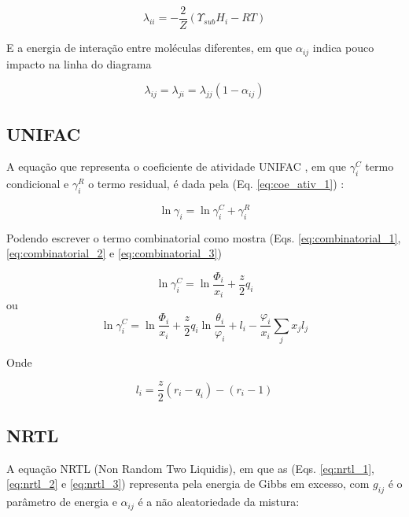 	\begin{equation}\label{eq:variacao_1}
	\lambda_{ii}=-\frac{2}{Z}\left(\Upsilon_{sub}H_{i}-RT\right)
	\end{equation}
	
	E a energia de interação entre moléculas diferentes, em que $\alpha_{ij}$ indica pouco impacto na linha do diagrama
	
	\begin{equation}\label{eq:variacao_2}
	\lambda_{ij}=\lambda_{ji}=\lambda_{jj}(1-\alpha_{ij})
	\end{equation}
	
	\subsection{UNIFAC}
	
	A equação que representa o coeficiente de atividade UNIFAC , em que $\gamma_{i}^{C}$ termo condicional e $\gamma_{i}^{R}$ o termo residual, é dada pela (Eq. \ref{eq:coe_ativ_1}) \cite{Rocha2011}:
	
	\begin{equation}\label{eq:coe_ativ_1}
	\ln\gamma_{i}=\ln\gamma_{i}^{C}+\gamma_{i}^{R}
	\end{equation}
	
	Podendo escrever o termo combinatorial como mostra (Eqs. \ref{eq:combinatorial_1}, \ref{eq:combinatorial_2} e \ref{eq:combinatorial_3})
	
	\begin{equation}\label{eq:combinatorial_1}
	\ln\gamma_{i}^{C}=\ln\frac{\Phi_{i}}{x_{i}}+\frac{z}{2}q_{i}
	\end{equation}
	ou
	\begin{equation}\label{eq:combinatorial_2}
	\ln\gamma_{i}^{C}=\ln\frac{\Phi_{i}}{x_{i}}+\frac{z}{2}q_{i}\ln\frac{\theta_{i}}{\varphi_{i}}+l_{i}-\frac{\varphi_{i}}{x_{i}}\sum_{j}x_{j}l_{j}
	\end{equation}
	
	Onde
	
	\begin{equation}\label{eq:combinatorial_3}
	l_{i}=\frac{z}{2}(r_{i}-q_{i})-(r_{i}-1)
	\end{equation}
	
	\subsection{NRTL}
	
	A equação NRTL (Non Random Two Liquidis), em que as (Eqs. \ref{eq:nrtl_1}, \ref{eq:nrtl_2} e \ref{eq:nrtl_3}) representa pela energia de Gibbs em excesso, com $g_{ij}$ é o parâmetro de energia e $\alpha_{ij}$ é a não aleatoriedade da mistura:
	
